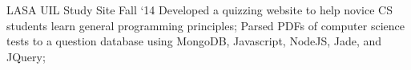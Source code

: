\project
    {LASA UIL Study Site}
    {Fall `14}
    {
        Developed a quizzing website to help novice CS students learn general programming
        principles;
        Parsed PDFs of computer science tests to a question database using MongoDB, Javascript,
        NodeJS, Jade, and JQuery;
    }
